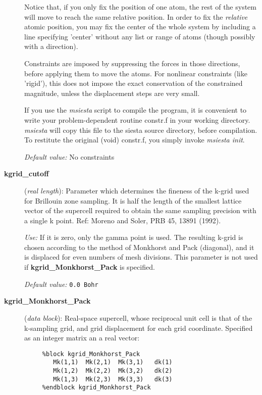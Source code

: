 \documentclass[11pt]{article}
\begin{document}
\begin{description}
Notice that, if you only fix the position of one atom, the rest of the
system will move to reach the same relative position. In order to
fix the {\it relative} atomic position, you may fix the center of
the whole system by including a line specifying 'center'
without any list or range of atoms (though possibly with a direction).

Constraints are imposed by suppressing the forces in those directions,
before applying them to move the atoms. For nonlinear constraints
(like 'rigid'), this does not impose the exact conservation of the 
constrained magnitude, unless the displacement steps are very small.

If you use the {\it msiesta} script to compile the program, it is
convenient to write your problem-dependent routine constr.f in your
working directory. {\it msiesta} will copy this file to the
siesta source directory, before compilation. To restitute the 
original (void) constr.f, you simply invoke {\it msiesta init}.

{\it Default value:} No constraints


\item[{\bf kgrid\_cutoff}] ({\it real length}): 
Parameter which determines
the fineness of the k-grid used for Brillouin zone sampling.
It is half the length of the smallest lattice vector of the supercell 
required to obtain the same sampling precision with a single k point.
Ref: Moreno and Soler, PRB 45, 13891 (1992).

{\it Use:} If it is zero, only the gamma point is used.
The resulting k-grid is chosen according to the method of
Monkhorst and Pack (diagonal), and it is displaced for even numbers 
of mesh divisions.
This parameter is not used if {\bf kgrid\_Monkhorst\_Pack} is specified.

{\it Default value:} {\tt 0.0 Bohr}
        

\item[{\bf kgrid\_Monkhorst\_Pack}] ({\it data block}): 
Real-space supercell, whose reciprocal unit cell is that of the
k-sampling grid, and grid displacement for each grid coordinate.
Specified as an integer matrix an a real vector:

\begin{verbatim}
     %block kgrid_Monkhorst_Pack
        Mk(1,1)  Mk(2,1)  Mk(3,1)   dk(1) 
        Mk(1,2)  Mk(2,2)  Mk(3,2)   dk(2) 
        Mk(1,3)  Mk(2,3)  Mk(3,3)   dk(3) 
     %endblock kgrid_Monkhorst_Pack 
\end{verbatim}


\end{description}
\end{document}
